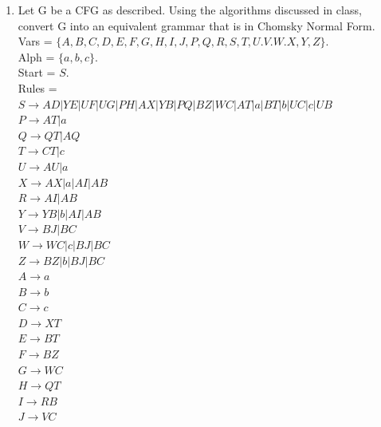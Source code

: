\documentclass[a4paper]{article}
\begin{document}
\begin{enumerate}
\begin{enumerate}
    \end{enumerate}
    
    \newpage
    \item Let G be a CFG as described. Using the algorithms discussed in class, 
    convert G into an equivalent grammar that is in Chomsky Normal Form. \\

    Vars = $\{ A, B, C, D, E, F, G, H, I, J, P, Q, R, S, T, U. V. W. X, Y, Z \}$. \\
    Alph = $\{ a, b, c \}$. \\
    Start = $S$. \\
    Rules = \\
    $S \rightarrow AD|YE|UF|UG|PH|AX|YB|PQ|BZ|WC|AT|a|BT|b|UC|c|UB$ \\
    $P \rightarrow AT|a$ \\
    $Q \rightarrow QT|AQ$ \\
    $T \rightarrow CT|c$ \\
    $U \rightarrow AU|a$ \\
    $X \rightarrow AX|a|AI|AB$ \\
    $R \rightarrow AI|AB$ \\
    $Y \rightarrow YB|b|AI|AB$ \\
    $V \rightarrow BJ|BC$ \\
    $W \rightarrow WC|c|BJ|BC$ \\
    $Z \rightarrow BZ|b|BJ|BC$ \\
    $A \rightarrow a$ \\
    $B \rightarrow b$ \\
    $C \rightarrow c$ \\
    $D \rightarrow XT$ \\
    $E \rightarrow BT$ \\
    $F \rightarrow BZ$ \\
    $G \rightarrow WC$ \\
    $H \rightarrow QT$ \\
    $I \rightarrow RB$ \\
    $J \rightarrow VC$ \\



  \end{enumerate}
\end{document}
